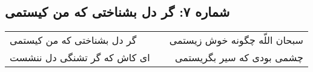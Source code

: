 \begin{center}
\section*{شماره ۷: گر دل بشناختی که من کیستمی}
\label{sec:007}
\begin{longtable}{l p{0.5cm} r}
گر دل بشناختی که من کیستمی
&&
سبحان اللّه چگونه خوش زیستمی
\\
ای کاش که گر تشنگی دل ننشست
&&
چشمی بودی که سیر بگریستمی
\\
\end{longtable}
\end{center}
